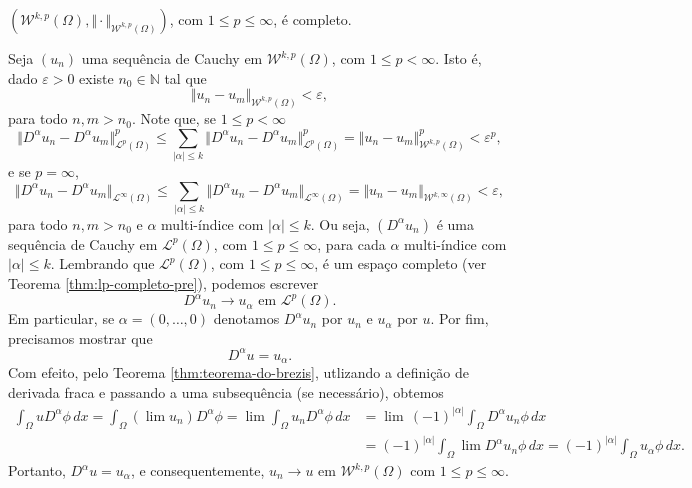 \documentclass[a4paper, 11pt]{book}
\theoremstyle{definition}
\newcommand{\bN}{\mathbb{N}}
\newcommand{\cL}{\mathcal{L}}
\newcommand{\cW}{\mathcal{W}}
\begin{document}
\begin{tbox} \label{thm:sobolev-completo}
    $(\cW^{k,p}(\Omega), \Vert \cdot \Vert_{\cW^{k,p}(\Omega)})$, com $1 \leqslant p \leqslant \infty$, é completo.
\end{tbox}
\begin{prf}
    Seja $(u_n)$ uma sequência de Cauchy em $\cW^{k,p}(\Omega)$, com $1 \leqslant p < \infty$. Isto é, dado $\varepsilon > 0$ existe $n_0 \in \bN$ tal que
    \[
        \Vert u_n - u_m \Vert_{\cW^{k,p}(\Omega)} < \varepsilon,
    \]
    para todo $n,m > n_0$.
    Note que, se $1 \leqslant p < \infty$
    \[
        \Vert D^\alpha u_n - D^\alpha u_m \Vert_{\cL^p(\Omega)}^p \leqslant \sum_{|\alpha| \leqslant k} \Vert D^\alpha u_n - D^\alpha u_m \Vert_{\cL^p(\Omega)}^p = \Vert u_n - u_m \Vert_{\cW^{k,p}(\Omega)}^p < \varepsilon^p,
    \]
    e se $p = \infty$,
    \[
        \Vert D^\alpha u_n - D^\alpha u_m \Vert_{\cL^\infty(\Omega)} \leqslant \sum_{|\alpha| \leqslant k} \Vert D^\alpha u_n - D^\alpha u_m \Vert_{\cL^\infty(\Omega)} = \Vert u_n - u_m \Vert_{\cW^{k,\infty}(\Omega)} < \varepsilon,
    \]
    para todo $n,m > n_0$ e $\alpha$ multi-índice com $|\alpha| \leqslant k$. Ou seja, $(D^\alpha u_n)$ é uma sequência de Cauchy em $\cL^p(\Omega)$, com $1 \leqslant p \leqslant \infty$, para cada $\alpha$ multi-índice com $|\alpha| \leqslant k$. Lembrando que $\cL^p(\Omega)$, com $1 \leqslant p \leqslant \infty$, é um espaço completo (ver Teorema \ref{thm:lp-completo-pre}), podemos escrever
    \[
        D^\alpha u_n \to u_\alpha \text{ em } \cL^p(\Omega).
    \]
    Em particular, se $\alpha = (0,\dots,0)$ denotamos $D^\alpha u_n$ por $u_n$ e $u_\alpha$ por $u$.
    Por fim, precisamos mostrar que
    \[
        D^\alpha u = u_\alpha.
    \]
Com efeito, pelo Teorema \ref{thm:teorema-do-brezis}, utlizando a definição de derivada fraca e passando a uma subsequência (se necessário), obtemos
    \[
        \begin{aligned}
            \int_\Omega u D^\alpha \phi \, dx 
            = \int_\Omega (\lim u_n) D^\alpha \phi 
            = \lim\! \int_\Omega u_n D^\alpha \phi \,dx
            &= \lim\, (-1)^{|\alpha|}\!\int_\Omega  D^\alpha u_n \phi\,dx \\
            &= (-1)^{|\alpha|}\!\int_\Omega \lim D^\alpha u_n \phi \,dx 
            = (-1)^{|\alpha|}\!\int_\Omega u_\alpha \phi \,dx.
        \end{aligned}
    \]
    Portanto, $D^\alpha u = u_\alpha$, e consequentemente, $u_n \to u$ em $\cW^{k,p}(\Omega)$ com $1 \leqslant p \leqslant \infty$.
\end{prf}
\end{document}
